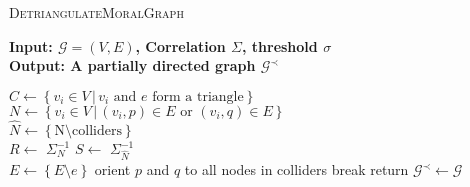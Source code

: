 \begin{algorithm}[H]
\caption{\textsc{DetriangulateMoralGraph}}
\label{algor:detriMoral}
\textbf{Input: $\mathcal{G} = (V, E)$, Correlation $\Sigma$, threshold $\sigma$} \\
\textbf{Output: A partially directed graph $\mathcal{G}^\prec$}\\\vspace{-4mm}
	\begin{algorithmic}[1]
			\STATE $C \leftarrow \left\lbrace v_i \in V \,|\, v_i\text{ and } e\text{ form a triangle}\right\rbrace$ \\
					\STATE {}
					\STATE $N \leftarrow \left\lbrace v_i \in V \,|\, (v_i, p) \in E \text{ or } (v_i, q) \in E \right\rbrace$ \\
					\STATE $\hat{N} \leftarrow \left\lbrace \text{N}\setminus \text{colliders}\right\rbrace $\\
					\STATE $R \leftarrow$ $\Sigma_N^{-1}$
					\STATE $S \leftarrow$ $\Sigma_{\hat{N}}^{-1}$
					\STATE {}\\
							\STATE $E \leftarrow \left\lbrace E\setminus e\right\rbrace$
							\STATE orient $p$ and $q$ to all nodes in colliders
							\STATE break
						\ENDIF
					\ENDIF		
				\ENDFOR	
		\ENDFOR		
		\STATE return $\mathcal{G}^\prec \leftarrow \mathcal{G}$
	\end{algorithmic}
\end{algorithm}